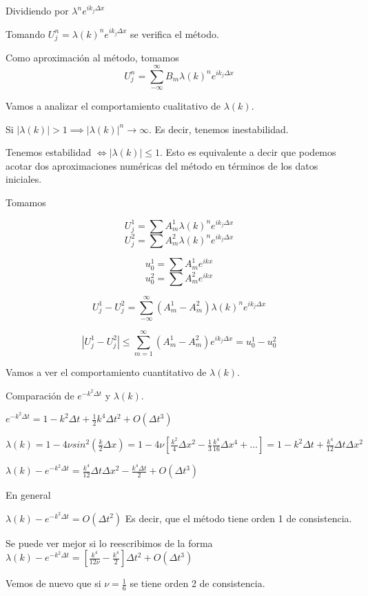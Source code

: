 Dividiendo por $\lambda^n e^{ik_j\Delta x}$



Tomando $U_j^n = \lambda(k)^n e^{ik_j\Delta x}$ se verifica el método.

Como aproximación al método, tomamos
$$U_j^n = \sum_{-\infty}^\infty B_m \lambda(k)^n e^{ik_j\Delta x}$$

Vamos a analizar el comportamiento cualitativo de $\lambda(k)$.

Si $|\lambda(k)| > 1 \implies |\lambda(k)|^n \to \infty$. Es decir, tenemos inestabilidad.

Tenemos estabilidad $\iff |\lambda(k)| \le 1$. Esto es equivalente a decir que podemos acotar dos aproximaciones numéricas del método en términos de los datos iniciales.

Tomamos

$$U_j^1 = \sum A_m^1 \lambda(k)^n e^{ik_j\Delta x}$$
$$U_j^2 = \sum A_m^2 \lambda(k)^n e^{ik_j\Delta x}$$

$$u_0^1 = \sum A_m^1 e^{ikx}$$
$$u_0^2 = \sum A_m^2 e^{ikx}$$

$$U_j^1 - U_j^2 = \sum_{-\infty}^\infty (A_m^1-A_m^2) \lambda(k)^n e^{ik_j\Delta x}$$

$$|U_j^1-U_j^2| \le \sum_{m=1}^\infty (A_m^1-A_m^2) e^{ik_j\Delta x} = u_0^1-u_0^2$$

Vamos a ver el comportamiento cuantitativo de $\lambda(k)$.

Comparación de $e^{-k^2\Delta t}$ y $\lambda(k)$.

$e^{-k^2\Delta t} = 1-k^2\Delta t + \frac{1}{2}k^4\Delta t ^2 + O(\Delta t ^3)$

$\lambda(k) = 1-4\nu sin^2(\frac{k}{2}\Delta x) = 1-4\nu\left[\frac{k^2}{4}\Delta x^2 - \frac{1}{3}\frac{k^4}{16}\Delta x^4 + \hdots \right] = 1-k^2\Delta t + \frac{k^4}{12}\Delta t \Delta x^2$

$\lambda(k) - e^{-k^2\Delta t} = \frac{k^4}{12}\Delta t \Delta x^2 - \frac{k^4\Delta t}{2} + O(\Delta t ^3)$

En general 

$\lambda(k) - e^{-k^2\Delta t} = O(\Delta t^2)$
Es decir, que el método tiene orden 1 de consistencia.

Se puede ver mejor si lo reescribimos de la forma
$\lambda(k) - e^{-k^2\Delta t} = \left[\frac{k^4}{12\nu}-\frac{k^4}{2}\right]\Delta t^2 + O(\Delta t^3)$

Vemos de nuevo que si $\nu = \frac{1}{6}$ se tiene orden 2 de consistencia.

